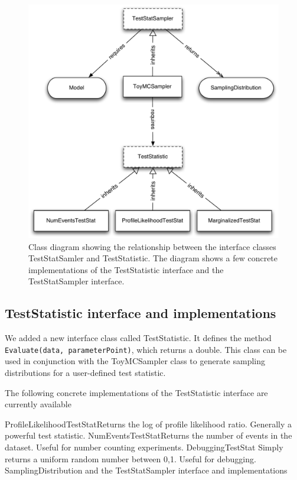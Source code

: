 \documentclass[11pt]{article}
\begin{document}
\begin{figure}[htbp]
\begin{center}
\includegraphics[width=\textwidth]{RooStats_TestStatistic.pdf}
\caption{Class diagram showing the relationship between the interface classes TestStatSamler and TestStatistic.  The diagram shows a few concrete implementations of the TestStatistic interface and the TestStatSampler interface.}
\label{fig:TestStatistic}
\end{center}
\end{figure}

	\subsection{TestStatistic interface and implementations}


We added a new interface class called TestStatistic. It defines the method \texttt{Evaluate(data, parameterPoint)}, which returns a double.  This class can be used in conjunction with the ToyMCSampler class to generate sampling distributions for a user-defined test statistic.  

The following concrete implementations of the TestStatistic interface are currently available

ProfileLikelihoodTestStatReturns the log of profile likelihood ratio.  Generally a powerful test statistic.
NumEventsTestStatReturns the number of events in the dataset.  Useful for number counting experiments.
DebuggingTestStat Simply returns a uniform random number between 0,1.  Useful for debugging.
SamplingDistribution and the TestStatSampler interface and implementations
\end{document}
